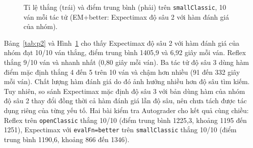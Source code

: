 \documentclass[conference]{IEEEtran}
\begin{document}
\begin{figure}[!t]
\centering
\begin{minipage}{0.49\columnwidth}
\centering
{}
\end{minipage}\hfill
\begin{minipage}{0.49\columnwidth}
\centering
{}
\end{minipage}
\caption{Tỉ lệ thắng (trái) và điểm trung bình (phải) trên \texttt{smallClassic}, 10 ván mỗi tác tử (EM+better: Expectimax độ sâu 2 với hàm đánh giá của nhóm).}
\label{fig:agents}
\end{figure}

Bảng~\ref{tab:p2} và Hình~\ref{fig:agents} cho thấy Expectimax độ sâu 2 với hàm đánh giá của nhóm đạt 10/10 ván thắng, điểm trung bình 1405,9 và 6,92 giây mỗi ván. Reflex thắng 9/10 ván và nhanh nhất (0,80 giây mỗi ván). Ba tác tử độ sâu 3 dùng hàm điểm mặc định thắng 4 đến 5 trên 10 ván và chậm hơn nhiều (91 đến 332 giây mỗi ván). Chất lượng hàm đánh giá do đó ảnh hưởng nhiều hơn độ sâu tìm kiếm. Tuy nhiên, so sánh Expectimax mặc định độ sâu 3 với bản dùng hàm của nhóm độ sâu 2 thay đổi đồng thời cả hàm đánh giá lẫn độ sâu, nên chưa tách được tác dụng riêng của từng yếu tố. Hai bài kiểm tra Autograder cho kết quả cùng chiều: Reflex trên \texttt{openClassic} thắng 10/10 (điểm trung bình 1225,3, khoảng 1195 đến 1251), Expectimax với \texttt{evalFn=better} trên \texttt{smallClassic} thắng 10/10 (điểm trung bình 1190,6, khoảng 866 đến 1346).
\end{document}
